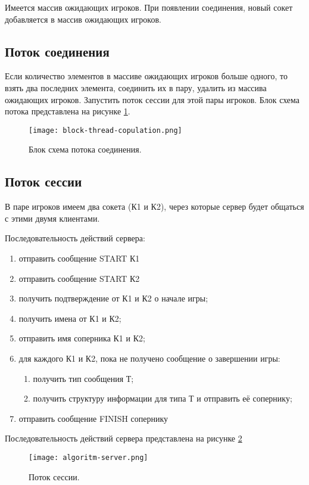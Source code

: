 Имеется массив ожидающих игроков. При появлении соединения, новый сокет добавляется в массив ожидающих игроков.

\subsection{Поток соединения}

Если количество элементов в массиве ожидающих игроков больше одного, то взять два последних элемента, соединить их в пару, удалить из массива ожидающих игроков. Запустить поток сессии для этой пары игроков. Блок схема потока представлена на рисунке \ref{image:thread-copulation}.

\begin{figure}[h]
  \centering
  \texttt{[image: block-thread-copulation.png]}
  \caption{Блок схема потока соединения.}
  \label{image:thread-copulation}
\end{figure}

\subsection{Поток сессии}

В паре игроков имеем два сокета (К1 и К2), через которые сервер будет общаться с этими двумя клиентами.

Последовательность действий сервера:
\begin{enumerate}
\item отправить сообщение START К1
\item отправить сообщение START К2
\item получить подтверждение от К1 и К2 о начале игры;
\item получить имена от К1 и К2;
\item отправить имя соперника К1 и К2;
\item для каждого К1 и К2, пока не получено сообщение о завершении игры:
	\begin{enumerate}
	\item получить тип сообщения Т;
	\item получить структуру информации для типа Т и отправить её сопернику;
	\end{enumerate}
\item отправить сообщение FINISH сопернику
\end{enumerate} 

Последовательность действий сервера представлена на рисунке \ref{image:algoritm-server}

\begin{figure}[h]
  \centering
  \texttt{[image: algoritm-server.png]}
  \caption{Поток сессии.}
  \label{image:algoritm-server}
\end{figure}

